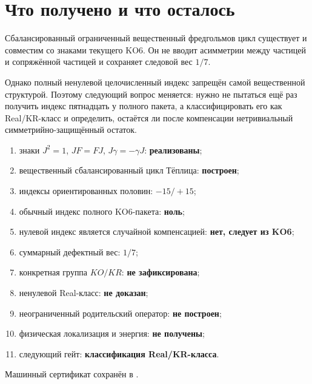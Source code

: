 \section{Что получено и что осталось}

Сбалансированный ограниченный вещественный фредгольмов цикл существует и
совместим со знаками текущего KO6. Он не вводит асимметрии между частицей
и сопряжённой частицей и сохраняет следовой вес $1/7$.

Однако полный ненулевой целочисленный индекс запрещён самой вещественной
структурой. Поэтому следующий вопрос меняется: нужно не пытаться ещё раз
получить индекс пятнадцать у полного пакета, а классифицировать его как
Real/KR-класс и определить, остаётся ли после компенсации нетривиальный
симметрийно-защищённый остаток.

\begin{protocol}
\begin{enumerate}
 \item знаки $J^2=1$, $JF=FJ$, $J\gamma=-\gamma J$:
 \textbf{реализованы};
 \item вещественный сбалансированный цикл Тёплица: \textbf{построен};
 \item индексы ориентированных половин: \textbf{$-15/+15$};
 \item обычный индекс полного KO6-пакета: \textbf{ноль};
 \item нулевой индекс является случайной компенсацией: \textbf{нет,
 следует из KO6};
 \item суммарный дефектный вес: \textbf{$1/7$};
 \item конкретная группа $KO/KR$: \textbf{не зафиксирована};
 \item ненулевой Real-класс: \textbf{не доказан};
 \item неограниченный родительский оператор: \textbf{не построен};
 \item физическая локализация и энергия: \textbf{не получены};
 \item следующий гейт: \textbf{классификация Real/KR-класса}.
\end{enumerate}
\end{protocol}

Машинный сертификат сохранён в
.
